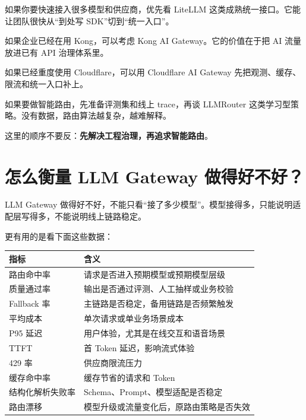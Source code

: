 \documentclass[10pt,a4paper]{ctexart}
\begin{document}
如果你要快速接入很多模型和供应商，优先看 LiteLLM 这类成熟统一接口。它能让团队很快从“到处写 SDK”切到“统一入口”。



如果企业已经在用 Kong，可以考虑 Kong AI Gateway。它的价值在于把 AI 流量放进已有 API 治理体系里。



如果已经重度使用 Cloudflare，可以用 Cloudflare AI Gateway 先把观测、缓存、限流和统一入口补上。



如果要做智能路由，先准备评测集和线上 trace，再谈 LLMRouter 这类学习型策略。没有数据，路由算法越复杂，越难解释。



这里的顺序不要反：\textbf{先解决工程治理，再追求智能路由}。



\section{怎么衡量 LLM Gateway 做得好不好？}


LLM Gateway 做得好不好，不能只看“接了多少模型”。模型接得多，只能说明适配层写得多，不能说明线上链路稳定。



更有用的是看下面这些数据：


{\footnotesize
\begin{tabularx}{\textwidth}{|X|X|}
\hline
\textbf{指标} & \textbf{含义} \\
\hline
路由命中率 & 请求是否进入预期模型或预期模型层级 \\
\hline
质量通过率 & 输出是否通过评测、人工抽样或业务校验 \\
\hline
Fallback 率 & 主链路是否稳定，备用链路是否频繁触发 \\
\hline
平均成本 & 单次请求或单业务场景成本 \\
\hline
P95 延迟 & 用户体验，尤其是在线交互和语音场景 \\
\hline
TTFT & 首 Token 延迟，影响流式体验 \\
\hline
429 率 & 供应商限流压力 \\
\hline
缓存命中率 & 缓存节省的请求和 Token \\
\hline
结构化解析失败率 & Schema、Prompt、模型适配是否稳定 \\
\hline
路由漂移 & 模型升级或流量变化后，原路由策略是否失效 \\
\hline
\end{tabularx}
}
\end{document}
